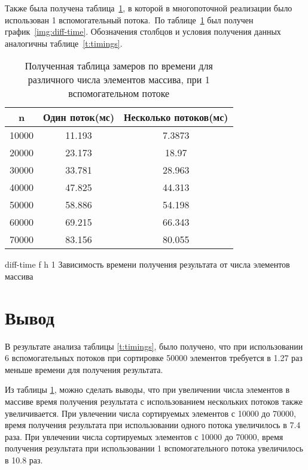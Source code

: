 Также была получена таблица~\ref{t:timings-n}, в которой в многопоточной реализации было использован 1 вспомогательный потока.~По таблице~\ref{t:timings-n} был получен график~\ref{img:diff-time}. 
Обозначения столбцов и условия получения данных аналогичны таблице~\ref{t:timings}.

\begin{table}[H]
	\centering
	\caption{Полученная таблица замеров по времени для различного числа элементов массива, при 1 вспомогательном потоке}
	\begin{tabular}{|c|c|c|}
		\hline
		n       & Один поток(мс) & Несколько потоков(мс) \\ \hline
		10000 & 11.193                  & 7.3873                            \\ \hline
		20000 & 23.173                  & 18.97                             \\ \hline
		30000 & 33.781                  & 28.963                            \\ \hline
		40000 & 47.825                  & 44.313                            \\ \hline
		50000 & 58.886                  & 54.198                            \\ \hline
		60000 & 69.215                  & 66.343                            \\ \hline
		70000 & 83.156                  & 80.055                            \\ \hline
	\end{tabular}
	\label{t:timings-n}
\end{table}




{diff-time} %
{f} %
{h} %
{1\textwidth} %
{Зависимость времени получения результата от числа элементов массива} %


\section*{Вывод}
В результате анализа таблицы \ref{t:timings}, было получено, что при использовании 6 вспомогательных потоков при сортировке 50000 элементов требуется в 1.27 раз меньше времени для получения результата. 

Из таблицы \ref{t:timings-n}, можно сделать выводы, что при увеличении числа элементов в массиве
время получения результата с использованием нескольких потоков также увеличивается. При увлечении числа сортируемых элементов с 10000 до 70000, время получения результата при использовании одного потока  увеличилось в 7.4 раза.
При увлечении числа сортируемых элементов с 10000 до 70000, время получения результата при использовании 1 вспомогательного потока увеличилось в 10.8 раз.


